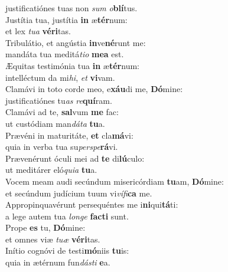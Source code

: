 \oddverse justificatiónes tuas non \textit{sum} \textit{o}\textbf{blí}tus.\\
\evenverse Justítia tua, justítia \textbf{in} æ\textbf{tér}num:~\*\\
\evenverse et lex \textit{tu}\textit{a} \textbf{vé}\textbf{ri}tas.\\
\oddverse Tribulátio, et angústia \textbf{in}ve\textbf{né}runt me:~\*\\
\oddverse mandáta tua meditá\textit{ti}\textit{o} \textbf{me}\textbf{a} est.\\
\evenverse Æquitas testimónia tua \textbf{in} æ\textbf{tér}num:~\*\\
\evenverse intelléctum da mi\textit{hi}, \textit{et} \textbf{vi}vam.\\
\oddverse Clamávi in toto corde meo, e\textbf{xáu}di me, \textbf{Dó}mine:~\*\\
\oddverse justificatiónes tu\textit{as} \textit{re}\textbf{quí}ram.\\
\evenverse Clamávi ad te, \textbf{sal}vum \textbf{me} fac:~\*\\
\evenverse ut custódiam man\textit{dá}\textit{ta} \textbf{tu}a.\\
\oddverse Prævéni in maturitáte, \textbf{et} cla\textbf{má}vi:~\*\\
\oddverse quia in verba tua su\textit{per}\textit{spe}\textbf{rá}vi.\\
\evenverse Prævenérunt óculi mei ad \textbf{te} di\textbf{lú}culo:~\*\\
\evenverse ut meditárer eló\textit{qui}\textit{a} \textbf{tu}a.\\
\oddverse Vocem meam audi secúndum misericórdiam \textbf{tu}am, \textbf{Dó}mine:~\*\\
\oddverse et secúndum judícium tuum vi\textit{ví}\textit{fi}\textbf{ca} me.\\
\evenverse Appropinquavérunt persequéntes me i\textbf{ni}qui\textbf{tá}ti:~\*\\
\evenverse a lege autem tua \textit{lon}\textit{ge} \textbf{fa}\textbf{cti} sunt.\\
\oddverse Prope \textbf{es} tu, \textbf{Dó}mine:~\*\\
\oddverse et omnes viæ \textit{tu}\textit{æ} \textbf{vé}\textbf{ri}tas.\\
\evenverse Inítio cognóvi de testi\textbf{mó}niis \textbf{tu}is:~\*\\
\evenverse quia in ætérnum fun\textit{dá}\textit{sti} \textbf{e}a.\\
